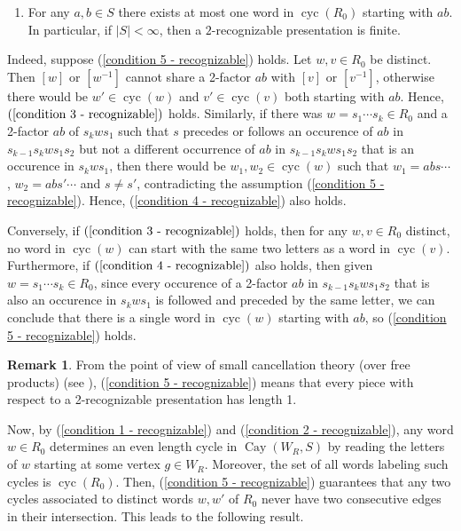 \documentclass[A4paper, oneside]{amsart}
\newcommand{\Cay}{\operatorname{Cay}}
\newcommand{\cyc}{\operatorname{cyc}}
\theoremstyle{definition}
\newtheorem{rem}[thm]{Remark}
\begin{document}
\begin{enumerate}[resume=2-recognizable]
	\item \label{condition 5 - recognizable} For any $a,b \in S$ there exists at most one word in $\cyc(R_0)$ starting with $ab$. In particular, if $|S|<\infty$, then a $2$-recognizable presentation is finite. 
\end{enumerate}

Indeed, suppose (\ref{condition 5 - recognizable}) holds. Let $w,v \in R_0$ be distinct. Then $[w]$ or $[w^{-1}]$ cannot share a 2-factor $ab$ with $[v]$ or $[v^{-1}]$, otherwise there would be $w' \in \cyc(w)$ and $v' \in \cyc(v)$ both starting with $ab$. Hence, $(\ref{condition 3 - recognizable})$ holds. Similarly, if there was $w = s_1 \cdots s_k \in R_0$ and a 2-factor $ab$ of $s_kws_1$ such that $s$ precedes or follows an occurence of $ab$ in $s_{k-1} s_kws_1 s_2$ but not a different occurrence of $ab$ in $s_{k-1} s_kws_1 s_2$ that is an occurence in $s_kws_1$, then there would be $w_1, w_2 \in \cyc(w)$ such that $w_1 = abs \cdots$, $w_2 = abs' \cdots$ and $s \neq s'$, contradicting the assumption (\ref{condition 5 - recognizable}). Hence, (\ref{condition 4 - recognizable}) also holds.

Conversely, if $(\ref{condition 3 - recognizable})$ holds, then for any $w,v \in R_0$ distinct, no word in $\cyc(w)$ can start with the same two letters as a word in $\cyc(v)$. Furthermore, if $(\ref{condition 4 - recognizable})$ also holds, then given $w = s_1 \cdots s_k \in R_0$, since every occurence of a 2-factor $ab$ in $s_{k-1} s_kws_1 s_2$ that is also an occurence in $s_kws_1$ is followed and preceded by the same letter, we can conclude that there is a single word in $\cyc(w)$ starting with $ab$, so (\ref{condition 5 - recognizable}) holds.
 
 \begin{rem} \label{rem: small cancellation}
 	From the point of view of small cancellation theory (over free products) (see \cite[\S5.9]{LyndonScupp}), (\ref{condition 5 - recognizable}) means that every piece with respect to a 2-recognizable presentation has length 1.
 \end{rem}

Now, by (\ref{condition 1 - recognizable}) and (\ref{condition 2 - recognizable}), any word $w \in R_0$ determines an even length cycle in $\Cay(W_R,S)$ by reading the letters of $w$ starting at some vertex $g \in W_R$. Moreover, the set of all words labeling such cycles is $\cyc(R_0)$. Then, (\ref{condition 5 - recognizable}) guarantees that any two cycles associated to distinct words $w,w'$ of $R_0$ never have two consecutive edges in their intersection. This leads to the following result.
\end{document}
